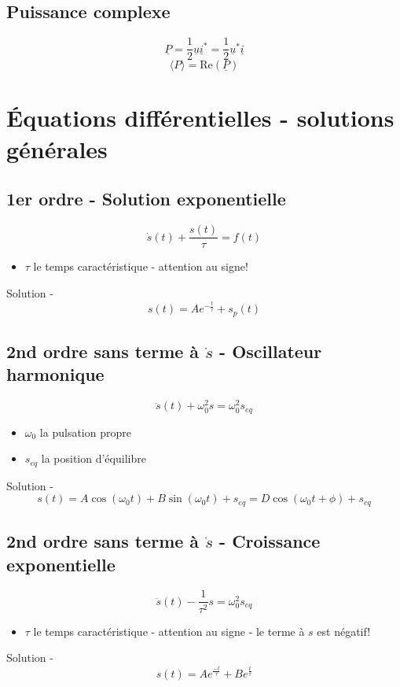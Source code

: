 \documentclass[openany]{book}
\begin{document}
\subsection{Puissance complexe}

\[ \underline{P} = \frac{1}{2}\underline{u}\underline{i}^* = \frac{1}{2}\underline{u}^*\underline{i} \]
\[ \langle P \rangle = \text{Re}(\underline{P}) \]

\section{Équations différentielles - solutions générales}

\subsection{1er ordre - Solution exponentielle}
\[ \dot{s}(t) + \frac{s(t)}{\tau} = f(t) \] 
\begin{itemize}
    \item $\tau$ le temps caractéristique - attention au signe!
\end{itemize}
Solution - 
\[ s(t) = Ae^{-\frac{t}{\tau}} + s_p(t) \]
        
\subsection{2nd ordre sans terme à $\dot{s}$ - Oscillateur harmonique}
\[ \ddot{s}(t) + \omega_0^2s = \omega_0^2s_{eq} \] 
\begin{itemize}
    \item $\omega_0$ la pulsation propre
    \item $s_{eq}$ la position d'équilibre
\end{itemize}
Solution - 
\[ s(t) = A\cos(\omega_0t)+B\sin(\omega_0t) + s_{eq} = D\cos(\omega_0t + \phi) + s_{eq} \]

\subsection{2nd ordre sans terme à $\dot{s}$ - Croissance exponentielle}
\[ \ddot{s}(t) - \frac{1}{\tau ^ 2} s = \omega_0^2s_{eq} \] 
\begin{itemize}
    \item $\tau$ le temps caractéristique - attention au signe - le terme à $s$ est négatif!
\end{itemize}
Solution - 
\[ s(t) = A e^{\frac{-t}{\tau}} + B e^{\frac{t}{\tau}} \]
        
\end{document}
